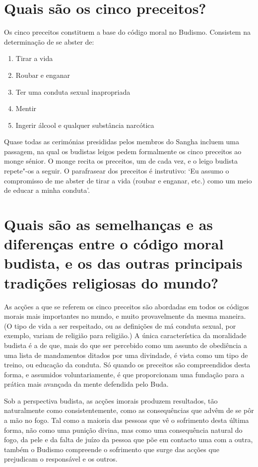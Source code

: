 \section{Quais são os cinco preceitos?}

Os cinco preceitos constituem a base do código moral no Budismo.
Consistem na determinação de se abster de:

\begin{enumerate}
\item Tirar a vida
\item Roubar e enganar
\item Ter uma conduta sexual inapropriada
\item Mentir
\item Ingerir álcool e qualquer substância narcótica
\end{enumerate}

Quase todas as cerimónias presididas pelos membros do Sangha incluem uma
passagem, na qual os budistas leigos pedem formalmente os cinco
preceitos ao monge sénior. O monge recita os preceitos, um de cada vez,
e o leigo budista repete"-os a seguir. O parafrasear dos preceitos é
instrutivo: `Eu assumo o compromisso de me abster de tirar a vida
(roubar e enganar, etc.) como um meio de educar a minha conduta'.

\section{Quais são as semelhanças e as diferenças entre o código moral budista,
  e os das outras principais tradições religiosas do mundo?}

As acções a que se referem os cinco preceitos são abordadas em todos os
códigos morais mais importantes no mundo, e muito provavelmente da mesma
maneira. (O tipo de vida a ser respeitado, ou as definições de má
conduta sexual, por exemplo, variam de religião para religião.) A única
característica da moralidade budista é a de que, mais do que ser
percebido como um assunto de obediência a uma lista de mandamentos
ditados por uma divindade, é vista como um tipo de treino, ou educação
da conduta. Só quando os preceitos são compreendidos desta forma, e
assumidos voluntariamente, é que proporcionam uma fundação para a
prática mais avançada da mente defendida pelo Buda.

Sob a perspectiva budista, as acções imorais produzem resultados, tão
naturalmente como consistentemente, como as consequências que advêm de
se pôr a mão no fogo. Tal como a maioria das pessoas que vê o sofrimento
desta última forma, não como uma punição divina, mas como uma
consequência natural do fogo, da pele e da falta de juízo da pessoa que
põe em contacto uma com a outra, também o Budismo compreende o
sofrimento que surge das acções que prejudicam o responsável e os
outros.

